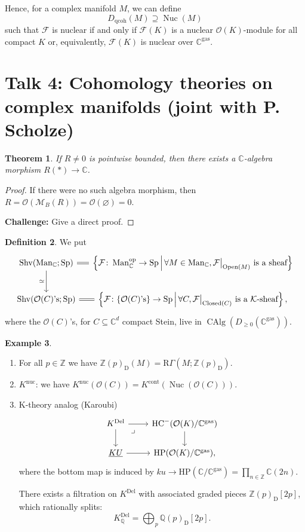 \documentclass[draft]{amsart}
\newcommand{\ZZ}{\mathbb{Z}}
\newcommand{\QQ}{\mathbb{Q}}
\newcommand{\CC}{\mathbb{C}}
\newcommand{\D}{\mathrm{D}}
\newcommand{\R}{\mathrm{R}}
\renewcommand{\O}{\mathcal{O}}
\newcommand{\set}[2]{\left\{#1\,\middle|\,#2\right\}}
\newcommand{\ul}[1]{\underline{#1}}
\newcommand{\cat}[1]{\mathcal{#1}}
\newcommand{\sheaf}[1]{\mathcal{#1}}
\renewcommand{\emptyset}{\varnothing}
\newcommand{\op}{\mathrm{op}}
\DeclareMathOperator{\Man}{Man}
\DeclareMathOperator{\Closed}{Closed}
\DeclareMathOperator{\CAlg}{CAlg}
\DeclareMathOperator{\Open}{Open}
\DeclareMathOperator{\Shv}{Shv}
\DeclareMathOperator{\Nuc}{Nuc}
\DeclareMathOperator{\Sp}{Sp}
\newtheorem{thm}{Theorem}[section]
\theoremstyle{definition}
\newtheorem{defn}[thm]{Definition}
\newtheorem{ex}[thm]{Example}
\begin{document}
Hence, for a complex manifold $M$, we can define 
\[
D_{\mathrm{qcoh}}(M) \supseteq \Nuc(M)
\]
such that $\sheaf F$ is nuclear if and only if $\sheaf F(K)$ is a nuclear $\O(K)$-module for all compact $K$ or, equivalently, $\sheaf F(K)$ is nuclear over $\CC^{\mathrm{gas}}$.

\section{Talk 4: Cohomology theories on complex manifolds (joint with P. Scholze)}

\begin{thm}
If $R\neq 0$ is pointwise bounded, then there exists a $\CC$-algebra morphism $R(*) \to \CC$.
\end{thm}
\begin{proof}
If there were no such algebra morphism, then $R = \O(\cat M_B(R)) = \O(\emptyset) = 0$.

\textbf{Challenge:} Give a direct proof.
\end{proof}

\begin{defn}
We put
\[
\begin{tikzcd}[column sep=small]
\Shv(\Man_{\CC}; \Sp) \ar[d,"\simeq"'] \ar[r,equals] & \set{\sheaf F\colon \Man_{\CC}^{\op} \to \Sp}{\forall M\in \Man_{\CC}, \text{$\sheaf F\big|_{\Open(M)}$ is a sheaf}} \\
\Shv(\O(C)\textnormal{'s};\Sp) \ar[r,equals] & \set{\sheaf F\colon \{\O(C)\textnormal{'s}\} \to \Sp}{\forall C, \text{$\sheaf F\big|_{\Closed(C)}$ is a $\cat K$-sheaf}},
\end{tikzcd}
\]
where the $\O(C)$'s, for $C\subseteq \CC^d$ compact Stein, live in $\CAlg(D_{\ge0}(\CC^{\mathrm{gas}}))$.
\end{defn}

\begin{ex}
\begin{enumerate}[(1)]
\item For all $p\in \ZZ$ we have $\ZZ(p)_{\D}(M) = \R\Gamma(M;\ZZ(p)_{\D})$.

\item $K^{\mathrm{nuc}}$: we have $K^{\mathrm{nuc}}(\O(C)) = K^{\mathrm{cont}}(\Nuc(\O(C)))$.

\item K-theory analog (Karoubi)
\[
\begin{tikzcd}
K^{\mathrm{Del}} \ar[d] \ar[r] \ar[dr,phantom, very near start, "\lrcorner"] & \mathrm{HC}^-(\O(K)/\CC^{\mathrm{gas}}) \ar[d] \\
\ul{KU} \ar[r] & \mathrm{HP}(\O(K)/\CC^{\mathrm{gas}}),
\end{tikzcd}
\]
where the bottom map is induced by $ku \to \mathrm{HP}(\CC/\CC^{\mathrm{gas}}) = \prod_{n\in\ZZ} \CC(2n)$.

There exists a filtration on $K^{\mathrm{Del}}$ with associated graded pieces $\ZZ(p)_{\D}[2p]$, which rationally splits:
\[
K^{\mathrm{Del}}_{\QQ} = \bigoplus_p \QQ(p)_{\D}[2p].
\]
\end{enumerate}
\end{ex}
\end{document}
